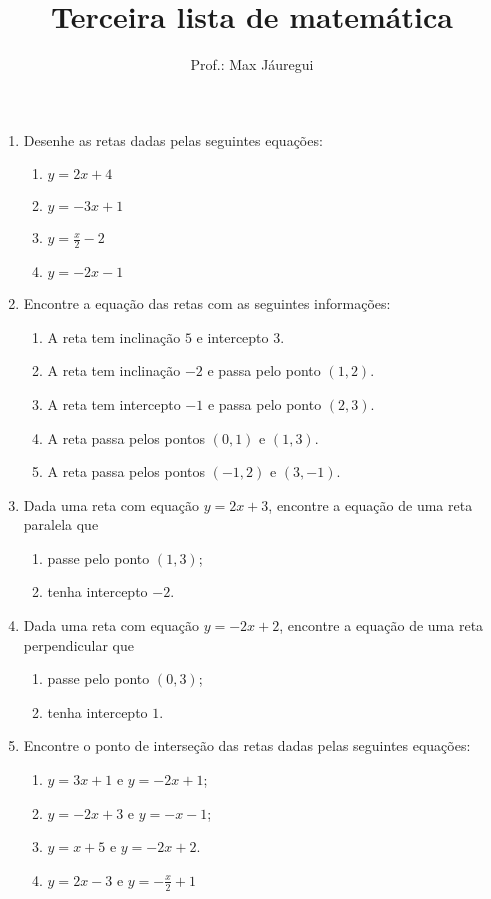 \documentclass[10pt,a4paper]{article}
\title{Terceira lista de matemática}
\author{Prof.: Max Jáuregui}
\date{}
\newcommand{\ds}{\displaystyle}
\begin{document}
\maketitle
\begin{enumerate}
  \item Desenhe as retas dadas pelas seguintes equações:
  \begin{enumerate}
  	\item $y=2x+4$
  	\item $y=-3x+1$
  	\item $\ds y=\frac{x}{2}-2$
  	\item $y=-2x-1$
  \end{enumerate}
\item Encontre a equação das retas com as seguintes informações:
\begin{enumerate}
	\item A reta tem inclinação $5$ e intercepto $3$.
	\item A reta tem inclinação $-2$ e passa pelo ponto $(1,2)$.
	\item A reta tem intercepto $-1$ e passa pelo ponto $(2,3)$.
	\item A reta passa pelos pontos $(0,1)$ e $(1,3)$.
	\item A reta passa pelos pontos $(-1,2)$ e $(3,-1)$. 
\end{enumerate}
\item Dada uma reta com equação $y=2x+3$, encontre a equação de uma reta paralela que
\begin{enumerate}
	\item passe pelo ponto $(1,3)$;
	\item tenha intercepto $-2$.
\end{enumerate}
\item Dada uma reta com equação $y=-2x+2$, encontre a equação de uma reta perpendicular que
\begin{enumerate}
	\item passe pelo ponto $(0,3)$;
	\item tenha intercepto $1$.
\end{enumerate}
\item Encontre o ponto de interseção das retas dadas pelas seguintes equações:
\begin{enumerate}
	\item $y=3x+1$ e $y=-2x+1$;
	\item $y=-2x+3$ e $y=-x-1$;
	\item $y=x+5$ e $y=-2x+2$.
	\item $y=2x-3$ e $\ds y=-\frac{x}{2}+1$
\end{enumerate}
\end{enumerate}
\end{document}
